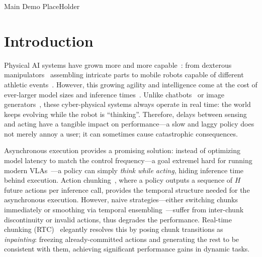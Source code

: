 \documentclass{article}
\begin{document}
Main Demo PlaceHolder



\newpage
\section{Introduction}
\label{sec:intro}

Physical AI systems have grown more and more capable~\citep{black2024pi_0, intelligence2025pi_, bjorck2025gr00t}: from dexterous manipulators~\citep{openai2018learning, an2025dexterous} assembling intricate parts to mobile robots capable of different athletic events~\citep{su2025hitter, zhang2026learningathletichumanoidtennis, yu2025skillmimic}.
However, this growing agility and intelligence come at the cost of ever-larger model sizes and inference times~\citep{kaplan2020scaling}.
Unlike chatbots~\citep{brown2020language, yang2025qwen3} or image generators~\citep{wan2025wan}, these cyber-physical systems always operate in real time: the world keeps evolving while the robot is ``thinking''.
Therefore, delays between sensing and acting have a tangible impact on performance---a slow and laggy policy does not merely annoy a user; it can sometimes cause catastrophic consequences.



Asynchronous execution provides a promising solution: instead of optimizing model latency to match the control frequency---a goal extremel hard for running modern VLAs~\citep{black2025real}---a policy can simply \emph{think while acting}, hiding inference time behind execution.
Action chunking~\citep{chi2025diffusion, lai2025action}, where a policy outputs a sequence of $H$ future actions per inference call, provides the temporal structure needed for the asynchronous execution.
However, naive strategies---either switching chunks immediately or smoothing via temporal ensembling~\citep{zhao2023learning}---suffer from inter-chunk discontinuity or invalid actions, thus degrades the performance.
Real-time chunking (RTC)~\citep{black2025real} elegantly resolves this by posing chunk transitions as \emph{inpainting}: freezing already-committed actions and generating the rest to be consistent with them, achieving significant performance gains in dynamic tasks.
\end{document}
